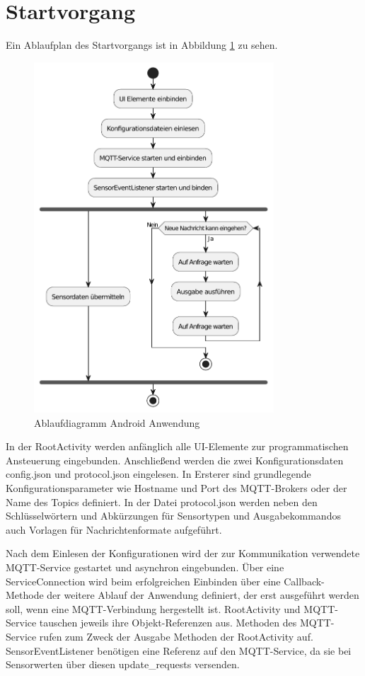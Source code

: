 \documentclass[11pt,a4paper]{report}
\begin{document}
\section{Startvorgang}
Ein Ablaufplan des Startvorgangs ist in Abbildung \ref{fig:app_flow} zu sehen.
\begin{figure}[htbp]
  \centering
  \includegraphics[width=0.8\textwidth]{images/app_ablauf}
  \caption{Ablaufdiagramm Android Anwendung}
  \label{fig:app_flow}
\end{figure}
In der RootActivity werden anfänglich alle UI-Elemente zur programmatischen Ansteuerung eingebunden.
Anschließend werden die zwei Konfigurationsdaten config.json und protocol.json eingelesen.
In Ersterer sind grundlegende Konfigurationsparameter wie Hostname und Port des MQTT-Brokers oder der Name des Topics definiert.
In der Datei protocol.json werden neben den Schlüsselwörtern und Abkürzungen für Sensortypen und Ausgabekommandos auch Vorlagen für Nachrichtenformate aufgeführt.

Nach dem Einlesen der Konfigurationen wird der zur Kommunikation verwendete MQTT-Service gestartet und asynchron eingebunden.
Über eine ServiceConnection wird beim erfolgreichen Einbinden über eine Callback-Methode der weitere Ablauf der Anwendung definiert, der erst ausgeführt werden soll, wenn eine MQTT-Verbindung hergestellt ist.
RootActivity und MQTT-Service tauschen jeweils ihre Objekt-Referenzen aus.
Methoden des MQTT-Service rufen zum Zweck der Ausgabe Methoden der RootActivity auf.
SensorEventListener benötigen eine Referenz auf den MQTT-Service, da sie bei Sensorwerten über diesen update\_requests versenden.
\end{document}
